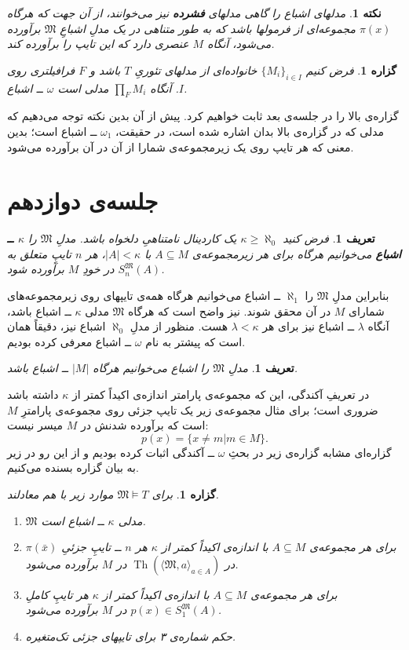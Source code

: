 \documentclass[12pt,a4paper]{article}
\theoremstyle{colorhead}
\newtheorem{prop}[thm]{گزاره}
\newtheorem{defn}[thm]{تعریف}
\newtheorem{nokte}[thm]{نکته}
\DeclareMathOperator{\Th}{Th}
\begin{document}
\begin{nokte}
مدلهای اشباع را گاهی مدلهای
\textbf{ فشرده }
 نیز می‌خوانند، از آن جهت که هرگاه
$\pi(x)$
مجموعه‌ای از فرمولها باشد که به طور متناهی در یک مدلِ اشباعِ
$\mathfrak{M}$
برآورده می‌شود، آنگاه $M$
عنصری دارد که این تایپ را برآورده کند. 
\end{nokte}
\begin{prop}
فرض کنیم 
$\{M_i\}_{i\in I}$
خانواده‌ای از مدلهای تئوریِ
$T$
باشد و 
$F$
فرافیلتری روی
$I$.
آنگاه
$\prod_{F}M_i$
مدلی است
$\omega$
ــ‌
 اشباع. 
\end{prop}
گزاره‌ی بالا را در جلسه‌ی بعد ثابت خواهیم کرد. پیش از آن بدین نکته توجه می‌دهیم که مدلی که در گزاره‌ی بالا بدان اشاره شده است، در حقیقت،
$\omega_1$
ــ 
اشباع است؛ بدین معنی که هر تایپ روی یک زیرمجموعه‌ی شمارا  از آن در آن برآورده می‌شود.
\pagebreak
\section{جلسه‌ی دوازدهم}
\begin{defn}
فرض کنید
$\kappa\geq \aleph_0$
یک کاردینال نامتناهیِ دلخواه باشد. مدلِ
$\mathfrak{M}$
را 
\textbf{$\kappa$ 
ــ
اشباع }
می‌خوانیم هرگاه
برای هر زیرمجموعه‌ی
$A\subseteq M$
با
$|A|<\kappa$،
هر 
$n$ 
تایپِ
متعلق به
$S_n^\mathfrak{M}(A)$
در خودِ
$M$
برآورده شود.
\end{defn}
بنابراین مدلِ
$\mathfrak{M}$
را
$\aleph_1$ 
ــ
اشباع می‌خوانیم هرگاه همه‌ی تایپهای روی زیرمجموعه‌های شمارای 
$M$
در آن محقق شوند. نیز واضح است که هرگاه
$\mathfrak{M}$
مدلی
$\kappa$ 
ــ 
اشباع باشد، آنگاه 
$\lambda$
ــ
اشباع نیز برای هر
$\lambda<\kappa$
هست. منظور از مدلِ 
$\aleph_0$
اشباع نیز، دقیقاً همان است که پیشتر به نام
$\omega$
ــ
اشباع معرفی کرده‌ بودیم. 
\begin{defn}
مدلِ
$\mathfrak{M}$
را 
اشباع می‌خوانیم هرگاه
$|M|$
ــ‌
اشباع باشد.
\end{defn}
در تعریفِ
آکندگی، این که مجموعه‌ی پارامتر اندازه‌ی اکیداً
کمتر از
$\kappa$
داشته باشد ضروری است؛‌ برای مثال مجموعه‌ی زیر یک تایپ جزئی روی مجموعه‌ی پارامترِ
$M$
است که برآورده شدنش در 
$M$
میسر نیست:
\[
p(x)=\{x\not=m|m\in M\}.
\]
گزاره‌ای 
مشابه گزاره‌ی زیر  در بحثِ
$\omega$
ــ
آکندگی اثبات کرده بودیم و از این رو در زیر به بیان گزاره بسنده می‌کنیم.
\begin{prop}
برای
$\mathfrak{M}\models T$
موارد زیر با هم معادلند.
\begin{enumerate}
\item
$\mathfrak{M}$
مدلی 
$\kappa$ 
ــ 
اشباع است.
\item
برای هر مجموعه‌ی 
$A\subseteq M$
با اندازه‌ی اکیداً کمتر از
$\kappa$
هر
$n$ ــ
تایپِ جزئیِ
$\pi(\bar{x})$
در
$\Th(\langle\mathfrak{M},a\rangle_{a\in  A})$
در
$M$
برآورده می‌شود.
\item
برای هر مجموعه‌ی 
$A\subseteq M$
با اندازه‌ی اکیداً کمتر از
$\kappa$
هر تایپِ کاملِ
$p(x)\in S_1^\mathfrak{M}(A)$
در
$M$
برآورده می‌شود.
\item 
حکم شماره‌ی ۳ برای تایپهای جزئی تک‌متغیره.
\end{enumerate}
\end{prop}
\end{document}
